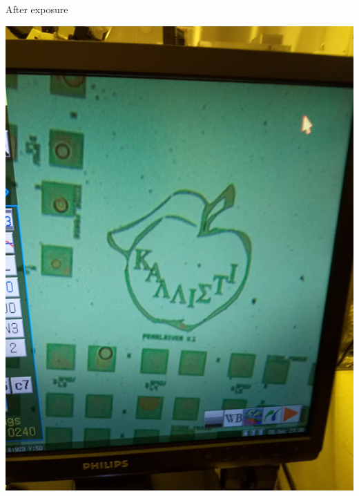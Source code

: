 \documentclass[aspectratio=169]{beamer}
\begin{document}
\begin{frame}{After exposure}
\begin{center}
\includegraphics[height=0.8\textheight]{images/20181210_125830_Burst01.jpg}

\end{center}
\end{frame}
\end{document}
